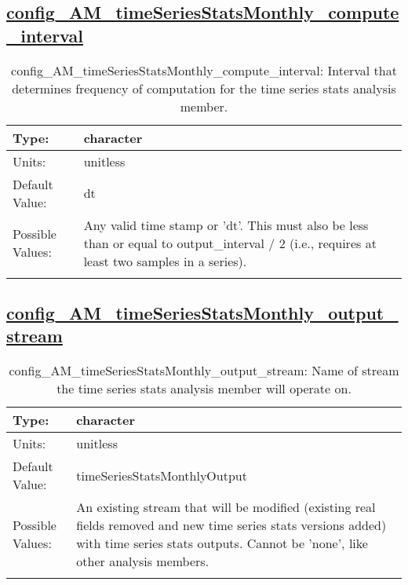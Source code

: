 \subsection[config\_AM\_timeSeriesStatsMonthly\_compute\_interval]{\hyperref[sec:nm_tab_AM_timeSeriesStatsMonthly]{config\_AM\_timeSeriesStatsMonthly\_compute\_interval}}
\label{subsec:nm_sec_config_AM_timeSeriesStatsMonthly_compute_interval}
\begin{center}
\begin{longtable}{| p{2.0in} || p{4.0in} |}
    \hline
    Type: & character \\
    \hline
    Units: & \si{unitless} \\
    \hline
    Default Value: & dt \\
    \hline
    Possible Values: & Any valid time stamp or 'dt'. This must also be less than or equal to output\_interval / 2 (i.e., requires at least two samples in a series). \\
    \hline
    \caption{config\_AM\_timeSeriesStatsMonthly\_compute\_interval: Interval that determines frequency of computation for the time series stats analysis member.}
\end{longtable}
\end{center}
\subsection[config\_AM\_timeSeriesStatsMonthly\_output\_stream]{\hyperref[sec:nm_tab_AM_timeSeriesStatsMonthly]{config\_AM\_timeSeriesStatsMonthly\_output\_stream}}
\label{subsec:nm_sec_config_AM_timeSeriesStatsMonthly_output_stream}
\begin{center}
\begin{longtable}{| p{2.0in} || p{4.0in} |}
    \hline
    Type: & character \\
    \hline
    Units: & \si{unitless} \\
    \hline
    Default Value: & timeSeriesStatsMonthlyOutput \\
    \hline
    Possible Values: & An existing stream that will be modified (existing real fields removed and new time series stats versions added) with time series stats outputs. Cannot be 'none', like other analysis members. \\
    \hline
    \caption{config\_AM\_timeSeriesStatsMonthly\_output\_stream: Name of stream the time series stats analysis member will operate on.}
\end{longtable}
\end{center}
